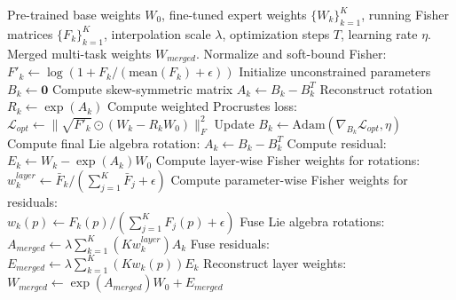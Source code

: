 \documentclass{article}
\theoremstyle{plain}
\theoremstyle{definition}
\theoremstyle{remark}
\begin{document}
\begin{algorithm}[tb]
\caption{Fisher-Weighted Procrustes Alignment with Fisher-Weighted Fusion (FWPA-FWF)}
\label{alg:fwpa_fwf}
\begin{algorithmic}[1]
 Pre-trained base weights $W_0$, fine-tuned expert weights $\{W_k\}_{k=1}^K$, running Fisher matrices $\{F_k\}_{k=1}^K$, interpolation scale $\lambda$, optimization steps $T$, learning rate $\eta$.
 Merged multi-task weights $W_{merged}$.
    \STATE Normalize and soft-bound Fisher: $F'_k \leftarrow \log(1 + F_k / (\text{mean}(F_k) + \epsilon))$
    \STATE Initialize unconstrained parameters $B_k \leftarrow \mathbf{0}$
        \STATE Compute skew-symmetric matrix $A_k \leftarrow B_k - B_k^T$
        \STATE Reconstruct rotation $R_k \leftarrow \exp(A_k)$
        \STATE Compute weighted Procrustes loss: \\
        $\mathcal{L}_{opt} \leftarrow \| \sqrt{F'_k} \odot (W_k - R_k W_0) \|_F^2$
        \STATE Update $B_k \leftarrow \text{Adam}(\nabla_{B_k} \mathcal{L}_{opt}, \eta)$
    \ENDFOR
    \STATE Compute final Lie algebra rotation: $A_k \leftarrow B_k - B_k^T$
    \STATE Compute residual: $E_k \leftarrow W_k - \exp(A_k) W_0$
\ENDFOR
{}
    \STATE Compute layer-wise Fisher weights for rotations: \\
    $w^{layer}_k \leftarrow \bar{F}_k / (\sum_{j=1}^K \bar{F}_j + \epsilon)$
    \STATE Compute parameter-wise Fisher weights for residuals: \\
    $w_k(p) \leftarrow F_k(p) / (\sum_{j=1}^K F_j(p) + \epsilon)$
    \STATE Fuse Lie algebra rotations: \\
    $A_{merged} \leftarrow \lambda \sum_{k=1}^K \left( K w^{layer}_k \right) A_k$
    \STATE Fuse residuals: \\
    $E_{merged} \leftarrow \lambda \sum_{k=1}^K \left( K w_k(p) \right) E_k$
    \STATE Reconstruct layer weights: \\
    $W_{merged} \leftarrow \exp(A_{merged}) W_0 + E_{merged}$
\ENDFOR
\end{algorithmic}
\end{algorithm}
\end{document}
